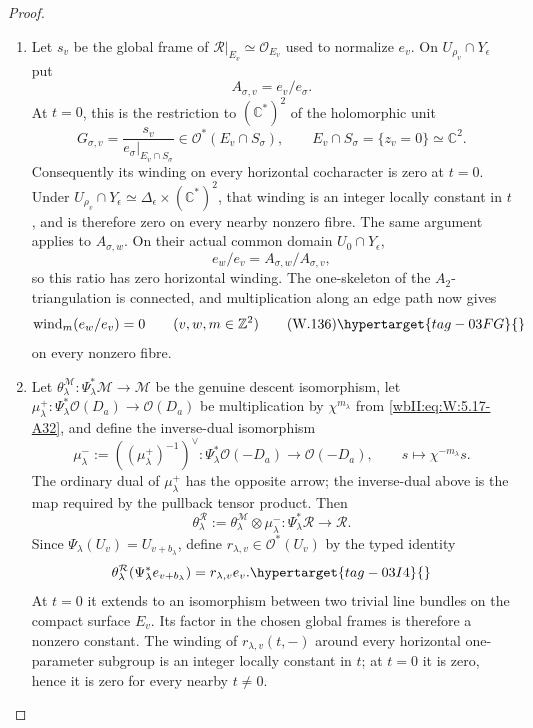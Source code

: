 \begin{proof}
\begin{enumerate}[label={$\langle1\rangle$\arabic*.},leftmargin=*]
\item Let \(s_v\) be the global frame of
\(\mathcal R|_{E_v}\simeq\mathcal O_{E_v}\) used to normalize \(e_v\).
On \(U_{\rho_v}\cap Y_\epsilon\) put
\[
 A_{\sigma,v}=e_v/e_\sigma.
\]
At \(t=0\), this is the restriction to \((\mathbb C^*)^2\) of the
holomorphic unit
\[
 G_{\sigma,v}
 =\frac{s_v}{e_\sigma|_{E_v\cap S_\sigma}}
 \in\mathcal O^*(E_v\cap S_\sigma),
 \qquad E_v\cap S_\sigma=\{z_v=0\}\simeq\mathbb C^2.
\]
Consequently its winding on every horizontal cocharacter is zero at
\(t=0\).  Under
\(U_{\rho_v}\cap Y_\epsilon\simeq
\Delta_\epsilon\times(\mathbb C^*)^2\), that winding is an integer locally
constant in \(t\), and is therefore zero on every nearby nonzero fibre.
The same argument applies to \(A_{\sigma,w}\).  On their actual common
domain \(U_0\cap Y_\epsilon\),
\[
 e_w/e_v=A_{\sigma,w}/A_{\sigma,v},
\]
so this ratio has zero horizontal winding.  The one-skeleton of the
\(A_2\)-triangulation is connected, and multiplication along an edge path
now gives
\[
 \operatorname{wind}_m(e_w/e_v)=0
 \qquad(v,w,m\in\mathbb Z^2)
\tag{W.136}\hypertarget{tag-03FG}{}\label{wbII:eq:W:5.17-A34b}
\]
on every nonzero fibre.

\item Let
\(\theta^{\mathcal M}_\lambda:\Psi_\lambda^*\mathcal M\to\mathcal M\)
be the genuine descent isomorphism, let
\(\mu^+_\lambda:\Psi_\lambda^*\mathcal O(D_a)\to\mathcal O(D_a)\)
be multiplication by \(\chi^{m_\lambda}\) from \eqref{wbII:eq:W:5.17-A32}, and define the
inverse-dual isomorphism
\[
 \mu^-_\lambda:=((\mu^+_\lambda)^{-1})^\vee:
 \Psi_\lambda^*\mathcal O(-D_a)\longrightarrow\mathcal O(-D_a),
 \qquad s\longmapsto\chi^{-m_\lambda}s.
\]
The ordinary dual of \(\mu^+_\lambda\) has the opposite arrow; the
inverse-dual above is the map required by the pullback tensor product.  Then
\[
 \theta^{\mathcal R}_\lambda
 :=\theta^{\mathcal M}_\lambda\otimes\mu^-_\lambda:
 \Psi_\lambda^*\mathcal R\longrightarrow\mathcal R.
\]
Since \(\Psi_\lambda(U_v)=U_{v+b_\lambda}\), define
\(r_{\lambda,v}\in\mathcal O^*(U_v)\) by the typed identity
\begin{equation}
 \theta^{\mathcal R}_\lambda
   (\Psi_\lambda^*e_{v+b_\lambda})
 =r_{\lambda,v}e_v.
\hypertarget{tag-03I4}{}\label{wbII:eq:analytic-residual-descent-factor}
\end{equation}
At \(t=0\) it extends to an isomorphism between two trivial line bundles
on the compact surface \(E_v\).  Its factor in the chosen global frames is
therefore a nonzero constant.  The winding of
\(r_{\lambda,v}(t,-)\) around every horizontal one-parameter subgroup is
an integer locally constant in \(t\); at \(t=0\) it is zero, hence it is
zero for every nearby \(t\ne0\).


\end{enumerate}
\end{proof}
